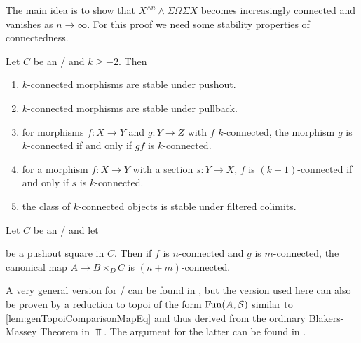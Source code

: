 The main idea is to show that $X^{\wedge n}\wedge\Sigma\Omega\Sigma X$ becomes increasingly connected and vanishes as $n\to\infty$.
For this proof we need some stability properties of connectedness.
\begin{prop}\label{prop:conn}
    Let $C$ be an \inftytop/ and $k\geq -2$.
    Then
    \begin{enumerate}[label={(\roman*)}]
        \item $k$-connected morphisms are stable under pushout. \label{prop:connStableUnderPo}
        \item $k$-connected morphisms are stable under pullback.\label{prop:connStableUnderPb}
        \item for morphisms $f\colon X\to Y$ and $g\colon Y\to Z$ with $f$ $k$-connected, the morphism $g$ is $k$-connected if and only if $gf$ is $k$-connected. \label{prop:connRightCancel}
        \item for a morphism $f\colon X\to Y$ with a section $s\colon Y\to X$, $f$ is $(k+1)$-connected if and only if $s$ is $k$-connected. \label{prop:connSection}
        \item the class of $k$-connected objects is stable under filtered colimits. \label{prop:connStableFilteredColim}
    \end{enumerate}
    \begin{reference}
        \cite[Proposition 4.10]{splittings_21}
    \end{reference}
\end{prop}
\begin{thm}\label{prop:blakersMassey}
    Let $C$ be an \inftytop/ and let 
    \begin{center}
    \end{center}
    be a pushout square in $C$.
    Then if $f$ is $n$-connected and $g$ is $m$-connected, the canonical map $A\to B\times_{D}C$ is $(n+m)$-connected.
    \begin{reference}
        A very general version for \inftytops/ can be found in \cite[Corollary 4.3.1]{gen_blakers_massey}, but the version used here can also be proven by a reduction to topoi of the form $\operatorname{Fun}(A,\mathcal{S})$ similar to \cref{lem:genTopoiComparisonMapEq} and thus derived from the ordinary Blakers-Massey Theorem in $\Top$.
        The argument for the latter can be found in \cite[Proposition 8.16]{toposes_and_htpy_toposes}.
    \end{reference}
\end{thm}
